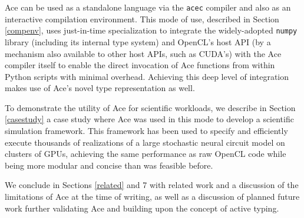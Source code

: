 \documentclass[9pt,preprint]{sigplanconf}
\begin{document}
Ace can be used as a standalone language via the \verb|acec| compiler and also as an interactive compilation environment. This mode of use, described in Section \ref{compenv}, uses just-in-time specialization to  integrate the widely-adopted \verb|numpy| library (including its internal type system) and OpenCL's host API (by a mechanism also available to other host APIs, such as CUDA's) with the Ace compiler itself to enable the direct invocation of Ace functions from within Python scripts with minimal overhead. Achieving this deep level of integration makes use of Ace's novel type representation as well.
 
To demonstrate the utility of Ace for scientific workloads, we describe in Section \ref{casestudy} a case study where Ace was used in this mode to develop a scientific simulation framework. This framework has been used to  specify and efficiently execute thousands of realizations of a large stochastic neural circuit model on clusters of GPUs, achieving the same performance as raw OpenCL code while being more modular and concise than was feasible before.

We conclude in Sections \ref{related} and 7 with related work and a discussion of the limitations of Ace at the time of writing, as well as a discussion of planned future work further validating Ace and building upon the concept of active typing.

\end{document}
